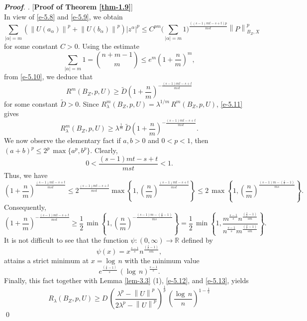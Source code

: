 \documentclass[a4paper,11pt, reqno]{amsart}
\theoremstyle{definition}
\newenvironment{pf}[1][]{%
	\vskip 3mm
	\noindent
	\ifthenelse{\equal{#1}{}}%
	{{\slshape {\bf Proof}. }}%
	{{\slshape #1.} }%
}%
{\qed\bigskip}
\newcommand{\norm}[1]{\left\lVert#1\right\rVert}
\begin{document}
\begin{pf} [{\bf Proof of Theorem \ref{thm-1.9}}]
\begin{equation}
\end{equation}
In view of \eqref{e-5.8} and \eqref{e-5.9}, we obtain 
\begin{equation} \label{e-5.10}
\sum_{|\alpha|=m} \left(\norm{U(a_{\alpha})}^p + \norm{U(b_{\alpha})}^p\right) |z^{\alpha}|^p \leq C^{pm} \bigg(\sum_{|\alpha|=m}1\bigg)^{\frac{((s-1)mt-s+t)p}{mst}} \norm{P}^p_{B_{Z},X}
\end{equation}
for some constant $C>0$. Using the estimate 
$$\sum_{|\alpha|=m} 1 =\binom{n+m-1}{m} \leq e^m \left(1+\frac{n}{m}\right)^m,
$$
from \eqref{e-5.10}, we deduce that 
\begin{equation} \label{e-5.11}
R^m(B_Z,p,U) \geq \tilde{D} \left(1+\frac{n}{m}\right)^{-\frac{(s-1)mt-s+t}{mst}}
\end{equation}
for some constant $\tilde{D}>0$. Since $R^m_{\lambda}(B_Z,p,U)=\lambda^{1/m} \, R^m(B_Z,p,U)$, \eqref{e-5.11} gives
\begin{equation} \label{e-5.12}
R^m_{\lambda}(B_Z,p,U) \geq\lambda^{\frac{1}{m}} \, \tilde{D} \left(1+\frac{n}{m}\right)^{-\frac{(s-1)mt-s+t}{mst}}.
\end{equation}
We now observe the elementary fact if $a,b>0$ and $0<p<1$, then $(a+b)^p \leq 2^p\, \max\{a^p, b^p\}$. Clearly, $$0<\frac{(s-1)mt-s+t}{mst}<1.$$
Thus, we have
\begin{equation*}
\left(1+\frac{n}{m}\right)^{\frac{(s-1)mt-s+t}{mst}} \leq 2^{\frac{(s-1)mt-s+t}{mst}} \max \left\{1, \left(\frac{n}{m}\right)^{\frac{(s-1)mt-s+t}{mst}}\right\} \leq 2\, \max \left\{1, \left(\frac{n}{m}\right)^{\frac{(s-1)m-(\frac{s}{t}-1)}{ms}}\right\}.
\end{equation*}
Consequently,
\begin{equation} \label{e-5.13}
	\left(1+\frac{n}{m}\right)^{-\frac{(s-1)mt-s+t}{mst}} \geq \frac{1}{2}\, \min \left\{1, \left(\frac{n}{m}\right)^{-\frac{(s-1)m-(\frac{s}{t}-1)}{ms}}\right\}=\frac{1}{2}\, \min \left\{1, \frac{m^{\frac{s-1}{s}}n^{\frac{(\frac{s}{t}-1)}{sm}}}{n^{\frac{s-1}{s}}m^{\frac{(\frac{s}{t}-1)}{sm}}}\right\}.
\end{equation}
It is not difficult  to see that the function $\psi: (0,\infty) \rightarrow \mathbb{R}$ defined by $$\psi(x)=x^{\frac{s-1}{s}} n^{\frac{(\frac{s}{t}-1)}{sm}},$$ attains a strict minimum at $x=\log \, n$ with the minimum value $$e^{\frac{(\frac{s}{t}-1)}{s}}\, (\log \, n)^{\frac{s-1}{s}}.$$ Finally, this fact together with Lemma \ref{lem-3.3} (1), \eqref{e-5.12}, and \eqref{e-5.13}, yields
\begin{equation} \label{e-5.15-added}
R_{\lambda}(B_Z,p,U) \geq D\,  \left(\frac{\lambda^p - \norm{U}^p}{2\lambda^p - \norm{U}^p}\right)^{\frac{1}{p}} \, \left(\frac{\log \, n}{n}\right)^{1-\frac{1}{s}}

\end{equation}
\end{pf}
\end{document}
